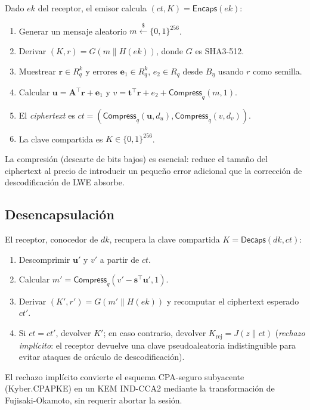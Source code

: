 Dado $ek$ del receptor, el emisor calcula $(ct, K) = \textsf{Encaps}(ek)$:

\begin{enumerate}
  \item Generar un mensaje aleatorio $m \xleftarrow{\$} \{0,1\}^{256}$.
  \item Derivar $(K, r) = G(m \| H(ek))$, donde $G$ es SHA3-512.
  \item Muestrear $\mathbf{r} \in R_q^k$ y errores $\mathbf{e}_1 \in R_q^k$, $e_2 \in R_q$ desde $B_\eta$ usando $r$ como semilla.
  \item Calcular $\mathbf{u} = \mathbf{A}^\top \mathbf{r} + \mathbf{e}_1$ y $v = \mathbf{t}^\top \mathbf{r} + e_2 + \textsf{Compress}_q(m, 1)$.
  \item El \emph{ciphertext} es $ct = (\textsf{Compress}_q(\mathbf{u}, d_u), \textsf{Compress}_q(v, d_v))$.
  \item La clave compartida es $K \in \{0,1\}^{256}$.
\end{enumerate}

La compresión (descarte de bits bajos) es esencial: reduce el tamaño del ciphertext al precio de introducir un pequeño error adicional que la corrección de descodificación de LWE absorbe.

\subsection{Desencapsulación}

El receptor, conocedor de $dk$, recupera la clave compartida $K = \textsf{Decaps}(dk, ct)$:

\begin{enumerate}
  \item Descomprimir $\mathbf{u}'$ y $v'$ a partir de $ct$.
  \item Calcular $m' = \textsf{Compress}_q(v' - \mathbf{s}^\top \mathbf{u}', 1)$.
  \item Derivar $(K', r') = G(m' \| H(ek))$ y recomputar el ciphertext esperado $ct'$.
  \item Si $ct = ct'$, devolver $K'$; en caso contrario, devolver $K_{\text{rej}} = J(z \| ct)$ (\emph{rechazo implícito}: el receptor devuelve una clave pseudoaleatoria indistinguible para evitar ataques de oráculo de descodificación).
\end{enumerate}

El rechazo implícito convierte el esquema CPA-seguro subyacente (Kyber.CPAPKE) en un KEM IND-CCA2 mediante la transformación de Fujisaki-Okamoto, sin requerir abortar la sesión.

